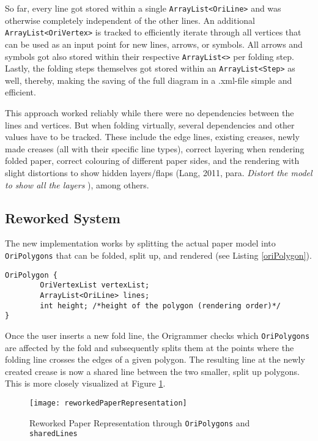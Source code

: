 So far, every line got stored within a single \texttt{ArrayList<OriLine>} and was otherwise completely independent of the other lines. An additional\\
\texttt{ArrayList<OriVertex>} is tracked to efficiently iterate through all vertices that can be used as an input point for new lines, arrows, or symbols. All arrows and symbols got also stored within their respective \texttt{ArrayList<>} per folding step. Lastly, the folding steps themselves got stored within an \texttt{ArrayList<Step>} as well, thereby, making the saving of the full diagram in a .xml-file simple and efficient.

This approach worked reliably while there were no dependencies between the lines and vertices. But when folding virtually, several dependencies and other values have to be tracked. These include the edge lines, existing creases, newly made creases (all with their specific line types), correct layering when rendering folded paper, correct colouring of different paper sides, and the rendering with slight distortions to show hidden layers/flaps (Lang, 2011, para. \emph{Distort the model to show all the layers} \cite{Lang}), among others.

\newpage
\subsection{Reworked System}

The new implementation works by splitting the actual paper model into \texttt{OriPolygons} that can be folded, split up, and rendered (see Listing \ref{oriPolygon}).
\begin{lstlisting}[label=oriPolygon,caption=OriPolygon]
OriPolygon {
        OriVertexList vertexList; 
        ArrayList<OriLine> lines;
        int height; /*height of the polygon (rendering order)*/
}
\end{lstlisting}

\noindent Once the user inserts a new fold line, the Origrammer checks which \texttt{OriPolygons} are affected by the fold and subsequently splits them at the points where the folding line crosses the edges of a given polygon. The resulting line at the newly created crease is now a shared line between the two smaller, split up polygons. This is more closely visualized at Figure \ref{fig:reworkedPaperRepresentation}.
 \begin{figure}[htbp]
	\centering
	\texttt{[image: reworkedPaperRepresentation]}
	\caption{Reworked Paper Representation through \texttt{OriPolygons} and \texttt{sharedLines}}
	\label{fig:reworkedPaperRepresentation}
\end{figure}

